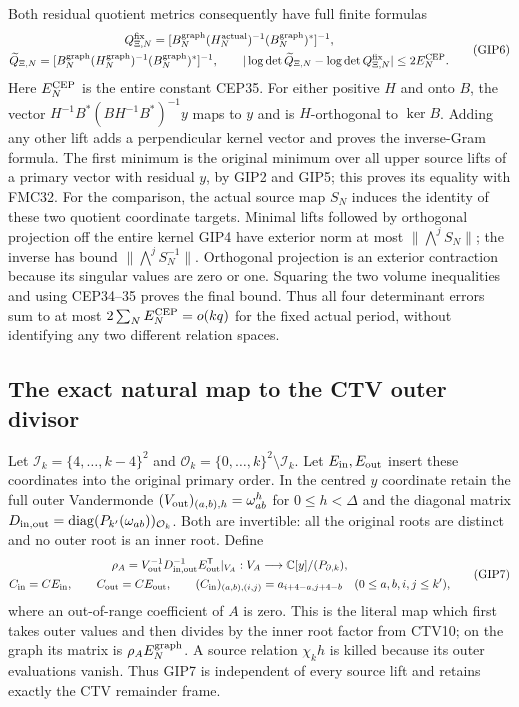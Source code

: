 \documentclass[11pt,a4paper]{article}
\begin{document}
Both residual quotient metrics consequently have full finite formulas
\[
 \begin{gathered}
 Q_{\Xi,N}^{\rm fix}
   =[B_N^{\rm graph}(H_N^{\rm actual})^{-1}(B_N^{\rm graph})^*]^{-1},\\
 \widetilde Q_{\Xi,N}
   =[B_N^{\rm graph}(H_N^{\rm graph})^{-1}(B_N^{\rm graph})^*]^{-1},\qquad
 |\log\det\widetilde Q_{\Xi,N}-\log\det Q_{\Xi,N}^{\rm fix}|
       \le2E_N^{\rm CEP}.
 \end{gathered}\tag{GIP6}
\]
Here $E_N^{\rm CEP}$ is the entire constant CEP35. For either
positive $H$ and onto $B$, the vector
$H^{-1}B^*(BH^{-1}B^*)^{-1}y$ maps to $y$ and is $H$-orthogonal
to $\ker B$. Adding any other lift adds a perpendicular kernel
vector and proves the inverse-Gram formula. The first minimum
is the original minimum over all upper source lifts of a primary
vector with residual $y$, by GIP2 and GIP5; this proves its equality
with FMC32. For the comparison, the actual source map $S_N$
induces the identity of these two quotient coordinate targets.
Minimal lifts followed by orthogonal projection off the entire
kernel GIP4 have exterior norm at most $\|\bigwedge^jS_N\|$;
the inverse has bound $\|\bigwedge^jS_N^{-1}\|$. Orthogonal
projection is an exterior contraction because its singular values
are zero or one. Squaring the two volume inequalities and using
CEP34--35 proves the final bound. Thus all four determinant errors
sum to at most $2\sum_NE_N^{\rm CEP}=o(kq)$ for the fixed
actual period, without identifying any two different relation spaces.

\subsection{The exact natural map to the CTV outer divisor}
Let $\mathcal I_k=\{4,\ldots,k-4\}^2$ and
$\mathcal O_k=\{0,\ldots,k\}^2\setminus\mathcal I_k$.
Let $E_{\rm in},E_{\rm out}$ insert these coordinates into the
original primary order. In the centred $y$ coordinate retain the
full outer Vandermonde
$(V_{\rm out})_{(a,b),h}=\omega_{ab}^h$ for $0\le h<\Delta$
and the diagonal matrix
$D_{\rm in,out}=\operatorname{diag}(P_{k'}(\omega_{ab}))_{\mathcal O_k}$.
Both are invertible: all the original roots are distinct and
no outer root is an inner root. Define
\[
 \begin{gathered}
 \rho_A=V_{\rm out}^{-1}D_{\rm in,out}^{-1}E_{\rm out}^{\mathsf T}|_{V_A}
      :V_A\longrightarrow\mathbb C[y]/(P_{\partial,k}),\\
 C_{\rm in}=CE_{\rm in},\qquad C_{\rm out}=CE_{\rm out},\qquad
 (C_{\rm in})_{(a,b),(i,j)}=a_{i+4-a,j+4-b}\quad(0\le a,b,i,j\le k'),
 \end{gathered}\tag{GIP7}
\]
where an out-of-range coefficient of $A$ is zero. This is the
literal map which first takes outer values and then divides by the
inner root factor from CTV10; on the graph its matrix is
$\rho_AE_N^{\rm graph}$. A source relation $\chi_kh$ is killed
because its outer evaluations vanish. Thus GIP7 is independent
of every source lift and retains exactly the CTV remainder frame.
\end{document}
